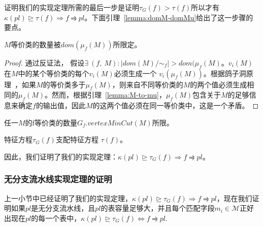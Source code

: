 证明我们的实现定理所需的最后一步是证明$\tau_G(f) > \tau(f)$所以才有$\kappa(pl)\trianglerighteq \tau(f) \Rightarrow f \rightrightharpoons pl$。下面引理~\ref{lemma:domM-domMu}给出了这一步骤的要点。
 
\begin{lemma} $M$等价类的数量被$dom(\mu_f(M))$所限定。
\label{lemma:domM-domMu}
\end{lemma}

\begin{proof}
通过反证法， 假设$\exists\ (f,\ M) : |dom(M)/\sim_f| > dom(\mu_f(M)$。$v_i(M)$ 在$M$中的某个等价类的每个$v_i(M)$必须生成一个 $v_i(\mu_f(M))$。根据鸽子洞原理~\cite{ajtai1988complexity}，如果$M$的等价类多于$\mu_f(M)$，则来自不同等价类的$M$的两个值必须生成相同的$\mu_f(M)$。然而，根据引理~\ref{lemma:M-to-mu}，$\mu_f(M)$包含关于$M$的足够信息来确定$f$的输出值，因此$M$的这两个值必须在同一等价类中，这是一个矛盾。
\end{proof}


\begin{corrollary} 任一$M$的f等价类的数量$G_f.vertexMinCut(M)$所限。
\label{lemma:eq-cl-approx}
\end{corrollary}

\begin{corrollary} 特征方程$\tau_G(f)$支配特征方程 $\tau(f)$。
\label{lemma:eq-cl-approx}
\end{corrollary}



因此，我们证明了我们的实现定理：$\kappa(pl)\trianglerighteq \tau_G(f) \Rightarrow f \rightrightharpoons pl$。

\subsubsection{无分支流水线实现定理的证明}

上一小节中已经证明了我们的实现定理，$\kappa(pl)\trianglerighteq \tau_G(f) \Rightarrow f \rightrightharpoons pl$，现在我们证明如果$pl$是无分支流水线，且$pl$的表容量足够大，并且每个匹配字段$m_i \in \mathcal{M}$正好出现在$pl$的每一个表中，$\kappa(pl) \trianglerighteq \tau_G(f) \Leftrightarrow f \rightrightharpoons pl$.
%
%

